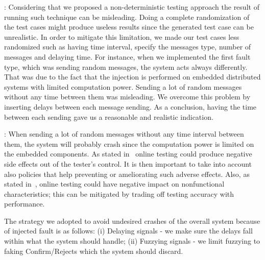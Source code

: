 : Considering %
that %
we proposed a non-deterministic testing approach %
the result of running such technique can be misleading. Doing a complete randomization of the test cases might produce useless results since the generated test case can be unrealistic. In order to mitigate this limitation, we made our test cases less randomized such as having time interval, specify the messages type, number of messages and delaying time. 
For instance, when we implemented the first fault type, which was sending random messages, the system acts always differently. That was due to the fact that the injection is performed on embedded distributed systems with limited computation power. 
Sending a lot of random messages without any time between them was misleading. We overcome this problem by inserting delays between each message sending. As a conclusion, having the time between each sending gave us a reasonable and realistic indication. 

: When sending a lot of random messages without any time interval between them, 
 the system will probably crash since the computation power is limited on the embedded components. As stated in~\cite{Ali2014} online testing 
could produce negative side effects out of the tester's control.
It is then important to take into account also policies that help preventing or ameliorating such adverse
effects. Also, as stated in~\cite{Ali2014}, online testing could have negative impact on nonfunctional characteristics; this can be mitigated by trading off
testing accuracy with performance.

The strategy we adopted to avoid undesired crashes of the overall system because of injected fault is as follows:  
(i) Delaying signals - we make sure the delays fall within what the system should handle; (ii) Fuzzying signals - we limit fuzzying to faking Confirm/Rejects which the system should discard. %




